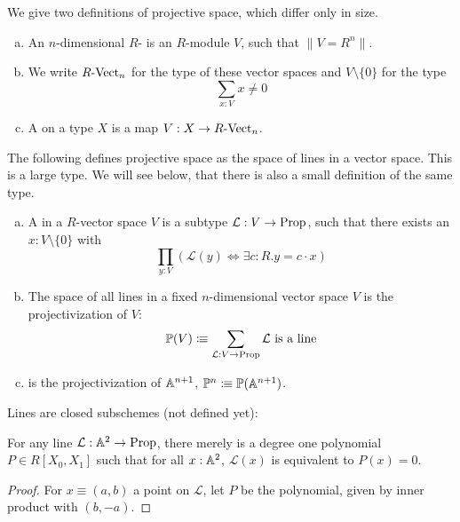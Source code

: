 
We give two definitions of projective space, which differ only in size.

\begin{definition}%
  \begin{enumerate}[(a)]
  \item An $n$-dimensional $R$- is an $R$-module $V$,
    such that $\| V = R^n \|$. 
  \item We write $R\text{-}\mathrm{Vect}_{n}$ for the type of these vector spaces and $V\setminus\{0\}$ for the type
    \[ \sum_{x:V}x\neq 0\]
  \item A  on a type $X$ is a map $V:X\to R\text{-}\mathrm{Vect}_{n}$. 
  \end{enumerate}
\end{definition}

The following defines projective space as the space of lines in a vector space.
This is a large type.
We will see below, that there is also a small definition of the same type.

\begin{definition}%
  \begin{enumerate}[(a)]
  \item   A  in a $R$-vector space $V$ is a subtype $\mathcal L:V\to \mathrm{Prop}$,
    such that there exists an $x:V\setminus\{0\}$ with
    \[ \prod_{y:V}\left(\mathcal L (y) \Leftrightarrow \exists c:R.y=c\cdot x\right)\]
  \item The space of all lines in a fixed $n$-dimensional vector space $V$ is the projectivization of $V$:
    \[ \mathbb{P}(V)\vcentcolon\mspace{-1.2mu}\equiv \sum_{\mathcal L:V\to \mathrm{Prop}} \mathcal L \text{ is a line}  \]
  \item {} is the projectivization of $\mathbb{A}^{n+1}$,
    $\mathbb{P}^n \vcentcolon\mspace{-1.2mu}\equiv \mathbb{P}(\mathbb{A}^{n+1})$.
  \end{enumerate}
\end{definition}

Lines are closed subschemes (not defined yet):

\begin{proposition}%
  For any line $\mathcal L : \mathbb{A}^{2}\to \mathrm{Prop}$, there merely is a degree one polynomial $P\in R[X_0,X_1]$ such that
  for all $x:\mathbb{A}^{2}$, $\mathcal L(x)$ is equivalent to $P(x)=0$.
\end{proposition}
\begin{proof}
  For $x\equiv(a,b)$ a point on $\mathcal L$,
  let $P$ be the polynomial, given by inner product with $(b,-a)$. 
\end{proof}


